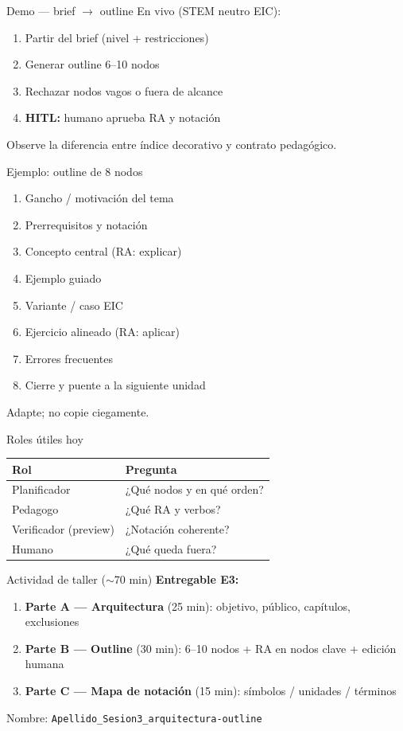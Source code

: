\documentclass[aspectratio=169,11pt]{beamer}
\begin{document}
\begin{frame}{Demo --- brief $\rightarrow$ outline}
En vivo (STEM neutro EIC):
\begin{enumerate}
\item Partir del brief (nivel + restricciones)
\item Generar outline 6--10 nodos
\item Rechazar nodos vagos o fuera de alcance
\item \textbf{HITL:} humano aprueba RA y notación
\end{enumerate}
Observe la diferencia entre índice decorativo y contrato pedagógico.
\end{frame}

\begin{frame}{Ejemplo: outline de 8 nodos}
\begin{enumerate}
\item Gancho / motivación del tema
\item Prerrequisitos y notación
\item Concepto central (RA: explicar)
\item Ejemplo guiado
\item Variante / caso EIC
\item Ejercicio alineado (RA: aplicar)
\item Errores frecuentes
\item Cierre y puente a la siguiente unidad
\end{enumerate}
Adapte; no copie ciegamente.
\end{frame}

\begin{frame}{Roles útiles hoy}
\begin{tabularx}{\textwidth}{@{}lX@{}}
\toprule
Rol & Pregunta \\
\midrule
Planificador & ¿Qué nodos y en qué orden? \\
Pedagogo & ¿Qué RA y verbos? \\
Verificador (preview) & ¿Notación coherente? \\
Humano & ¿Qué queda fuera? \\
\bottomrule
\end{tabularx}
\end{frame}

\begin{frame}{Actividad de taller ($\sim$70 min)}
\textbf{Entregable E3:}
\begin{enumerate}
\item \textbf{Parte A --- Arquitectura} (25 min): objetivo, público, capítulos, exclusiones
\item \textbf{Parte B --- Outline} (30 min): 6--10 nodos + RA en nodos clave + edición humana
\item \textbf{Parte C --- Mapa de notación} (15 min): símbolos / unidades / términos
\end{enumerate}
Nombre: \texttt{Apellido\_Sesion3\_arquitectura-outline}
\end{frame}
\end{document}

